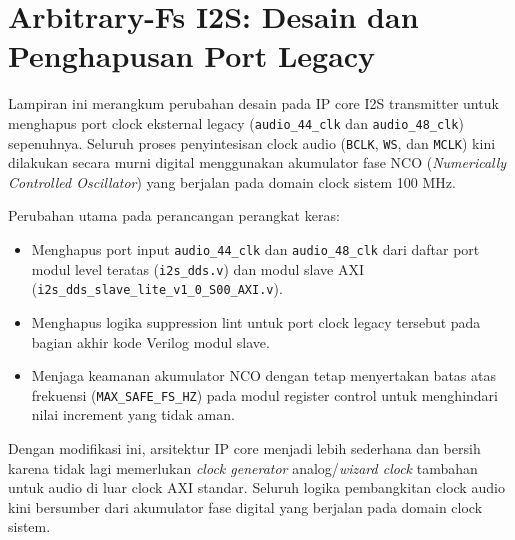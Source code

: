 \appendix
\chapter{Arbitrary-Fs I2S: Desain dan Penghapusan Port Legacy}
\label{app:arbitrary-fs}

Lampiran ini merangkum perubahan desain pada IP core I2S transmitter untuk menghapus port clock eksternal legacy (\texttt{audio\_44\_clk} dan \texttt{audio\_48\_clk}) sepenuhnya. Seluruh proses penyintesisan clock audio (\texttt{BCLK}, \texttt{WS}, dan \texttt{MCLK}) kini dilakukan secara murni digital menggunakan akumulator fase NCO (\textit{Numerically Controlled Oscillator}) yang berjalan pada domain clock sistem 100 MHz.

Perubahan utama pada perancangan perangkat keras:
\begin{itemize}
    \item Menghapus port input \texttt{audio\_44\_clk} dan \texttt{audio\_48\_clk} dari daftar port modul level teratas (\texttt{i2s\_dds.v}) dan modul slave AXI (\texttt{i2s\_dds\_slave\_lite\_v1\_0\_S00\_AXI.v}).
    \item Menghapus logika suppression lint untuk port clock legacy tersebut pada bagian akhir kode Verilog modul slave.
    \item Menjaga keamanan akumulator NCO dengan tetap menyertakan batas atas frekuensi (\texttt{MAX\_SAFE\_FS\_HZ}) pada modul register control untuk menghindari nilai increment yang tidak aman.
\end{itemize}

Dengan modifikasi ini, arsitektur IP core menjadi lebih sederhana dan bersih karena tidak lagi memerlukan \textit{clock generator} analog/\textit{wizard clock} tambahan untuk audio di luar clock AXI standar. Seluruh logika pembangkitan clock audio kini bersumber dari akumulator fase digital yang berjalan pada domain clock sistem.
